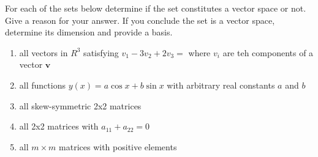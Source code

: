 For each of the sets below determine if the set constitutes a vector space or not. Give a reason for your answer. If you conclude the set is a vector space, determine its dimension and provide a basis.
	\begin{enumerate}
		\item all vectors in $R^3$ satisfying $v_1-3v_2+2v_3=$ where $v_i$ are teh components of a vector $\boldsymbol{v}$
		\item all functions $y\left(x\right)= a \cos x+ b\sin x$ with arbitrary real constants $a$ and $b$
		\item all skew-symmetric 2x2 matrices
		\item all 2x2 matrices with $a_{11}+a_{22}=0$
		\item all $m \times m$ matrices with positive elements
	\end{enumerate}
	
